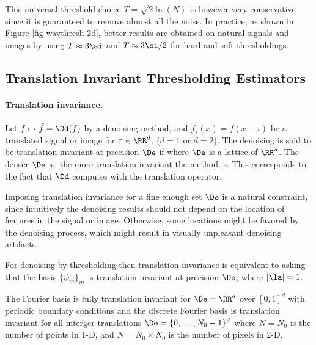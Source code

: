 This universal threshold choice $T=\sqrt{2\ln(N)}$ is however very conservative since it is guaranteed to remove almost all the noise. In practice, as shown in Figure \ref{fig-wavthresh-2d}, better results are obtained on natural signals and images by using $T \approx 3\si$ and $T \approx 3\si/2$ for hard and soft thresholdings.


\subsection{Translation Invariant Thresholding Estimators}

\paragraph{Translation invariance.}

Let $f \mapsto \tilde f = \Dd(f)$ by a denoising method, and $f_\tau(x) = f(x-\tau)$ be a translated signal or image for $\tau \in \RR^d$, ($d=1$ or $d=2$).
The denoising is said to be translation invariant at precision $\De$ if
where $\De$ is a lattice of $\RR^d$. The denser $\De$ is, the more translation invariant the method is.
This corresponds to the fact that $\Dd$ computes with the translation operator.
\begin{center}
\end{center}
Imposing translation invariance for a fine enough set $\De$ is a natural constraint, since intuitively the denoising results should not depend on the location of features in the signal or image. Otherwise, some locations might be favored by the denoising process, which might result in visually unpleasant denoising artifacts.

For denoising by thresholding 
then translation invariance is equivalent to asking that the basis $\{\psi_m\}_m$ is translation invariant at precision $\De$, 
where $|\la|=1$.

The Fourier basis is fully translation invariant for $\De=\RR^d$ over $[0,1]^d$ with periodic boundary conditions and the discrete Fourier basis is translation invariant for all interger translations $\De=\{0,\ldots,N_0-1\}^d$ where $N=N_0$ is the number of points in 1-D, and $N=N_0 \times N_0$ is the number of pixels in 2-D.

